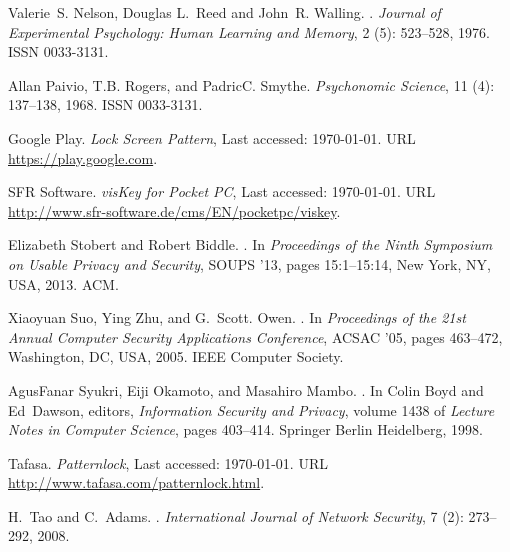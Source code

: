 \documentclass[conference]{IEEEtran}
\begin{document}
\begin{thebibliography}{23}
Valerie~S. Nelson, Douglas L.~Reed and John~R. Walling.
.
\newblock \emph{Journal of Experimental Psychology: Human Learning and Memory},
  2 (5): 523--528, 1976.
\newblock ISSN 0033-3131.

Allan Paivio, T.B. Rogers, and PadricC. Smythe.
\newblock \emph{Psychonomic Science}, 11 (4): 137--138, 1968.
\newblock ISSN 0033-3131.

Google Play.
\newblock \emph{Lock Screen Pattern}, Last accessed: \today{}.
\newblock URL \url{https://play.google.com}.

SFR Software.
\newblock \emph{visKey for Pocket PC}, Last accessed: \today{}.
\newblock URL \url{http://www.sfr-software.de/cms/EN/pocketpc/viskey}.

Elizabeth Stobert and Robert Biddle.
.
\newblock In \emph{Proceedings of the Ninth Symposium on Usable Privacy and
  Security}, SOUPS '13, pages 15:1--15:14, New York, NY, USA, 2013. ACM.

Xiaoyuan Suo, Ying Zhu, and G.~Scott. Owen.
.
\newblock In \emph{Proceedings of the 21st Annual Computer Security
  Applications Conference}, ACSAC '05, pages 463--472, Washington, DC, USA,
  2005. IEEE Computer Society.

AgusFanar Syukri, Eiji Okamoto, and Masahiro Mambo.
.
\newblock In Colin Boyd and Ed~Dawson, editors, \emph{Information Security and
  Privacy}, volume 1438 of \emph{Lecture Notes in Computer Science}, pages
  403--414. Springer Berlin Heidelberg, 1998.

Tafasa.
\newblock \emph{Patternlock}, Last accessed: \today{}.
\newblock URL \url{http://www.tafasa.com/patternlock.html}.

H.~Tao and C.~Adams.
.
\newblock \emph{International Journal of Network Security}, 7
  (2): 273--292, 2008.


\end{thebibliography}
\end{document}
